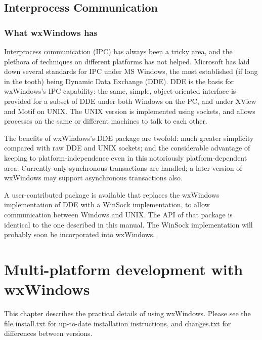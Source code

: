 \section{Interprocess Communication}\label{ipc}

\subsection{What wxWindows has}

Interprocess communication (IPC) has always been a tricky area, and the
plethora of techniques on different platforms has not helped. Microsoft
has laid down several standards for IPC under MS Windows, the most
established (if long in the tooth) being Dynamic Data Exchange (DDE).
DDE is the basis for wxWindows's IPC capability: the same, simple,
object-oriented interface is provided for a subset of DDE under both
Windows on the PC, and under XView and Motif on UNIX. The UNIX version
is implemented using sockets, and allows processes on the same or
different machines to talk to each other.

The benefits of wxWindows's DDE package are twofold: much greater
simplicity compared with raw DDE and UNIX sockets; and the considerable
advantage of keeping to platform-independence even in this notoriously
platform-dependent area. Currently only synchronous transactions are
handled; a later version of wxWindows may support asynchronous
transactions also.

A user-contributed package is available that replaces the wxWindows
implementation of DDE with a WinSock implementation, to allow
communication between Windows and UNIX. The API of that package is
identical to the one described in this manual. The WinSock implementation
will probably soon be incorporated into wxWindows.

%

\chapter{Multi-platform development with wxWindows}\label{multiplat}
%
\setfooter{\thepage}{}{}{}{}{\thepage}%

This chapter describes the practical details of using wxWindows. Please
see the file install.txt for up-to-date installation instructions, and
changes.txt for differences between versions.

